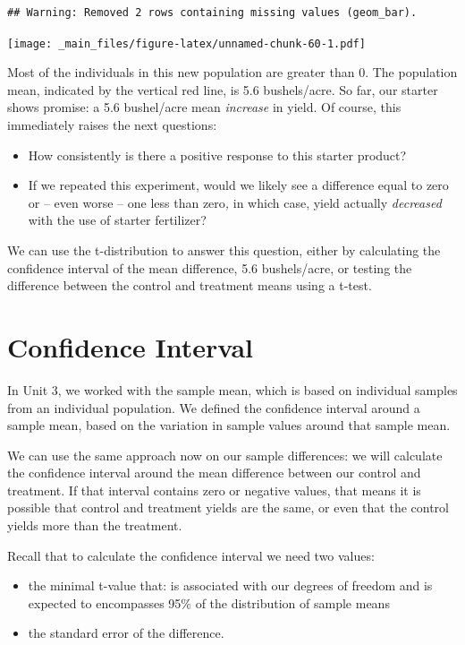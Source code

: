 \documentclass[
]{book}
\begin{document}
\begin{verbatim}
## Warning: Removed 2 rows containing missing values (geom_bar).
\end{verbatim}

\texttt{[image: \_main\_files/figure-latex/unnamed-chunk-60-1.pdf]}

Most of the individuals in this new population are greater than 0. The
population mean, indicated by the vertical red line, is 5.6
bushels/acre. So far, our starter shows promise: a 5.6 bushel/acre mean
\emph{increase} in yield. Of course, this immediately raises the next
questions:

\begin{itemize}
\item
  How consistently is there a positive response to this starter
  product?
\item
  If we repeated this experiment, would we likely see a difference
  equal to zero or -- even worse -- one less than zero\emph{,} in which
  case, yield actually \emph{decreased} with the use of starter fertilizer?
\end{itemize}

We can use the t-distribution to answer this question, either by
calculating the confidence interval of the mean difference, 5.6
bushels/acre, or testing the difference between the control and
treatment means using a t-test.

\hypertarget{confidence-interval-1}{%
\section{Confidence Interval}\label{confidence-interval-1}}

In Unit 3, we worked with the sample mean, which is based on individual
samples from an individual population. We defined the confidence
interval around a sample mean, based on the variation in sample values
around that sample mean.

We can use the same approach now on our sample differences: we will
calculate the confidence interval around the mean difference between our
control and treatment. If that interval contains zero or negative
values, that means it is possible that control and treatment yields are
the same, or even that the control yields more than the treatment.

Recall that to calculate the confidence interval we need two values:

\begin{itemize}
\item
  the minimal t-value that: is associated with our degrees of freedom
  and is expected to encompasses 95\% of the distribution of sample
  means
\item
  the standard error of the difference.
\end{itemize}
\end{document}

